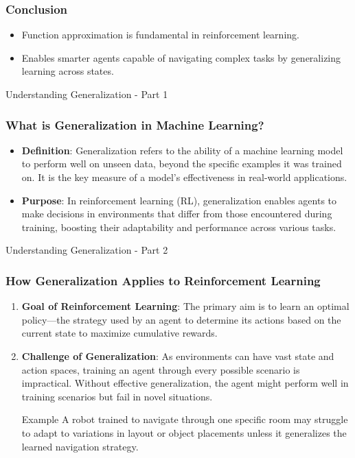 \documentclass[aspectratio=169]{beamer}
\begin{document}
\begin{frame}[fragile]
    \frametitle{Conclusion}
    \begin{itemize}
        \item Function approximation is fundamental in reinforcement learning.
        \item Enables smarter agents capable of navigating complex tasks by generalizing learning across states.
    \end{itemize}
\end{frame}

\begin{frame}[fragile]{Understanding Generalization - Part 1}
    \frametitle{What is Generalization in Machine Learning?}
    \begin{itemize}
        \item \textbf{Definition}: Generalization refers to the ability of a machine learning model to perform well on unseen data, beyond the specific examples it was trained on. It is the key measure of a model's effectiveness in real-world applications.
        \item \textbf{Purpose}: In reinforcement learning (RL), generalization enables agents to make decisions in environments that differ from those encountered during training, boosting their adaptability and performance across various tasks.
    \end{itemize}
\end{frame}

\begin{frame}[fragile]{Understanding Generalization - Part 2}
    \frametitle{How Generalization Applies to Reinforcement Learning}
    \begin{enumerate}
        \item \textbf{Goal of Reinforcement Learning}: The primary aim is to learn an optimal policy—the strategy used by an agent to determine its actions based on the current state to maximize cumulative rewards.
        \item \textbf{Challenge of Generalization}: As environments can have vast state and action spaces, training an agent through every possible scenario is impractical. Without effective generalization, the agent might perform well in training scenarios but fail in novel situations.
            \begin{block}{Example}
                A robot trained to navigate through one specific room may struggle to adapt to variations in layout or object placements unless it generalizes the learned navigation strategy.
            \end{block}
    \end{enumerate}
\end{frame}
\end{document}
